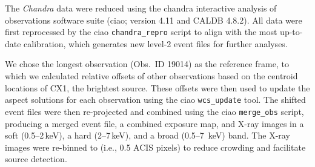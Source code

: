 \documentclass[fleqn,usenatbib]{mnras}
\newcommand{\revised}[1]{{\color{black}{#1}}}
\begin{document}
\begin{table}
    \centering
    \caption{{\it Chandra} observations used in this work.}
    \label{t:chandra_obs}
\end{table}

The {\it Chandra} data were reduced using the {\sc chandra interactive analysis of observations} software suite ({\sc ciao}; version 4.11 and CALDB 4.8.2). All data were first reprocessed by the {\sc ciao} {\tt chandra\_repro} script to align with the most up-to-date calibration, which generates new level-2 event files for further analyses. 

We chose the longest observation (Obs.\ ID 19014) as the reference frame, to which we calculated relative offsets of other observations based on the centroid locations of CX1, the brightest source. These offsets were then used to update the aspect solutions for each observation using the {\sc ciao} {\tt wcs\_update} tool. The shifted event files were then re-projected and combined using the {\sc ciao} {\tt merge\_obs} script, producing a merged event file, a combined exposure map, and X-ray images in a soft (0.5--2\,keV), a hard (2--7\,keV), and a broad (0.5--7\, keV) band. The X-ray images were re-binned to %
\revised{0\farcs25}
(i.e., 0.5 ACIS pixels) to reduce crowding and facilitate source detection. %
\end{document}

